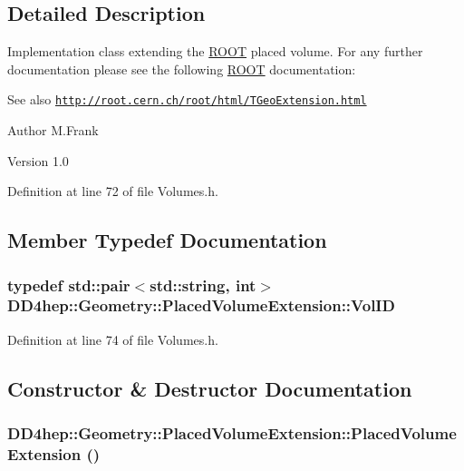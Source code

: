 \subsection{Detailed Description}
Implementation class extending the \hyperlink{namespace_r_o_o_t}{ROOT} placed volume. For any further documentation please see the following \hyperlink{namespace_r_o_o_t}{ROOT} documentation: \begin{DoxySeeAlso}{See also}
\href{http://root.cern.ch/root/html/TGeoExtension.html}{\tt http://root.cern.ch/root/html/TGeoExtension.html}
\end{DoxySeeAlso}
\begin{DoxyAuthor}{Author}
M.Frank 
\end{DoxyAuthor}
\begin{DoxyVersion}{Version}
1.0 
\end{DoxyVersion}


Definition at line 72 of file Volumes.h.

\subsection{Member Typedef Documentation}
\hypertarget{class_d_d4hep_1_1_geometry_1_1_placed_volume_extension_a9f0e95dedfbda206b118af985b2ed473}{
\subsubsection[{VolID}]{\setlength{\rightskip}{0pt plus 5cm}typedef std::pair$<$std::string, int$>$ {\bf DD4hep::Geometry::PlacedVolumeExtension::VolID}}}
\label{class_d_d4hep_1_1_geometry_1_1_placed_volume_extension_a9f0e95dedfbda206b118af985b2ed473}


Definition at line 74 of file Volumes.h.

\subsection{Constructor \& Destructor Documentation}
\hypertarget{class_d_d4hep_1_1_geometry_1_1_placed_volume_extension_a6c84f8e08ebab9beb999c827056b3f4d}{
\subsubsection[{PlacedVolumeExtension}]{\setlength{\rightskip}{0pt plus 5cm}DD4hep::Geometry::PlacedVolumeExtension::PlacedVolumeExtension ()}}
\label{class_d_d4hep_1_1_geometry_1_1_placed_volume_extension_a6c84f8e08ebab9beb999c827056b3f4d}


